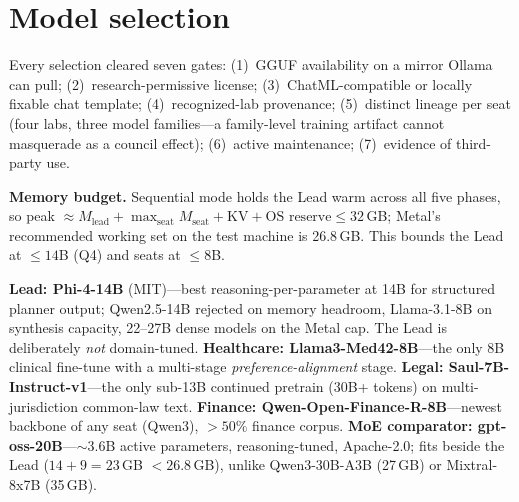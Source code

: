 \documentclass[11pt]{article}
\begin{document}
\section{Model selection}
Every selection cleared seven gates: (1)~GGUF availability on a mirror Ollama can pull; (2)~research-permissive license; (3)~ChatML-compatible or locally fixable chat template; (4)~recognized-lab provenance; (5)~distinct lineage per seat (four labs, three model families---a family-level training artifact cannot masquerade as a council effect); (6)~active maintenance; (7)~evidence of third-party use.

\textbf{Memory budget.} Sequential mode holds the Lead warm across all five phases, so peak $\approx M_{\text{lead}} + \max_{\text{seat}} M_{\text{seat}} + \text{KV} + \text{OS reserve} \le 32$\,GB; Metal's recommended working set on the test machine is 26.8\,GB. This bounds the Lead at $\le 14$B (Q4) and seats at $\le 8$B.

\textbf{Lead: Phi-4-14B} (MIT)---best reasoning-per-parameter at 14B for structured planner output; Qwen2.5-14B rejected on memory headroom, Llama-3.1-8B on synthesis capacity, 22--27B dense models on the Metal cap. The Lead is deliberately \emph{not} domain-tuned. \textbf{Healthcare: Llama3-Med42-8B}---the only 8B clinical fine-tune with a multi-stage \emph{preference-alignment} stage. \textbf{Legal: Saul-7B-Instruct-v1}---the only sub-13B continued pretrain (30B+ tokens) on multi-jurisdiction common-law text. \textbf{Finance: Qwen-Open-Finance-R-8B}---newest backbone of any seat (Qwen3), $>50\%$ finance corpus. \textbf{MoE comparator: gpt-oss-20B}---${\sim}3.6$B active parameters, reasoning-tuned, Apache-2.0; fits beside the Lead ($14+9=23$\,GB $< 26.8$\,GB), unlike Qwen3-30B-A3B (27\,GB) or Mixtral-8x7B (35\,GB).
\end{document}
